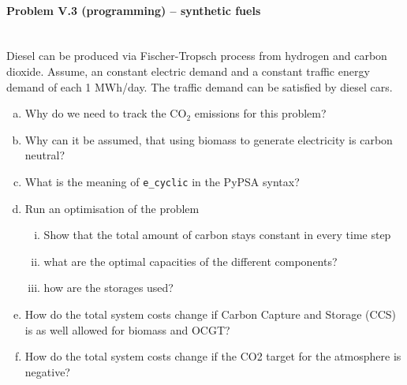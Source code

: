 \documentclass[11pt,a4paper,fleqn]{scrartcl}
\begin{document}
\paragraph{Problem V.3 (programming) -- synthetic fuels \faHome}~\\
Diesel can be produced via Fischer-Tropsch process from hydrogen and carbon dioxide. Assume, an constant electric demand and a constant traffic energy demand of each 1 MWh/day. The traffic demand can be satisfied by diesel cars.
\begin{enumerate}[(a)]
	\item Why do we need to track the CO$_2$ emissions for this problem?
	\item Why can it be assumed, that using biomass to generate electricity is carbon neutral?
	\item What is the meaning of \texttt{e\_cyclic} in the PyPSA syntax?
	\item Run an optimisation of the problem
		\begin{enumerate}[(i)]
		\item Show that the total amount of carbon stays constant in every time step
		\item what are the optimal capacities of the different components?
		\item how are the storages used?
		\end{enumerate}
	\item How do the total system costs change if Carbon Capture and Storage (CCS) is as well allowed for biomass and OCGT?
	\item How do the total system costs change if the CO2 target for the atmosphere is negative?
\end{enumerate} 
\end{document}
